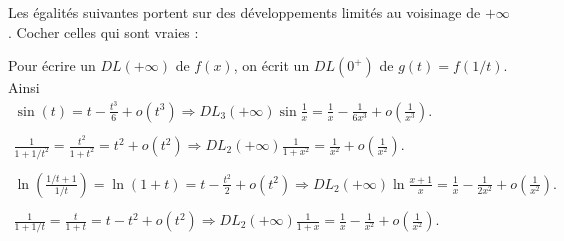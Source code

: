 \begin{question}
Les égalités suivantes portent sur des développements limités au voisinage de $+\infty$. Cocher celles qui sont vraies :
\begin{answers}  
\end{answers}
\vskip2mm
\begin{explanations}
Pour écrire un $DL(+\infty)$ de $f(x)$, on écrit un $DL(0^+)$ de $g(t)=f(1/t)$. Ainsi
$$\begin{array}{l}\displaystyle \sin\left(t\right)=t-\frac{t^3}{6}+o(t^3)\Rightarrow DL_3(+\infty)\sin \frac{1}{x}=\frac{1}{x}-\frac{1}{6x^3}+o\left(\frac{1}{x^3}\right).\\ \\ \displaystyle \frac{1}{1+1/t^2}=\frac{t^2}{1+t^2}=t^2+o(t^2)\Rightarrow DL_2(+\infty)\frac{1}{1+x^2}=\frac{1}{x^2}+o\left(\frac{1}{x^2}\right).\\ \\ \displaystyle \ln \left(\frac{1/t+1}{1/t}\right)=\ln (1+t)=t-\frac{t^2}{2}+o(t^2)\Rightarrow DL_2(+\infty)\ln \frac{x+1}{x}=\frac{1}{x}-\frac{1}{2x^2}+o\left(\frac{1}{x^2}\right).\\ \\ \displaystyle \frac{1}{1+1/t}=\frac{t}{1+t}=t-t^2+o(t^2)\Rightarrow DL_2(+\infty)\frac{1}{1+x}=\frac{1}{x}-\frac{1}{x^2}+o\left(\frac{1}{x^2}\right).\end{array}$$
\end{explanations}
\end{question}

